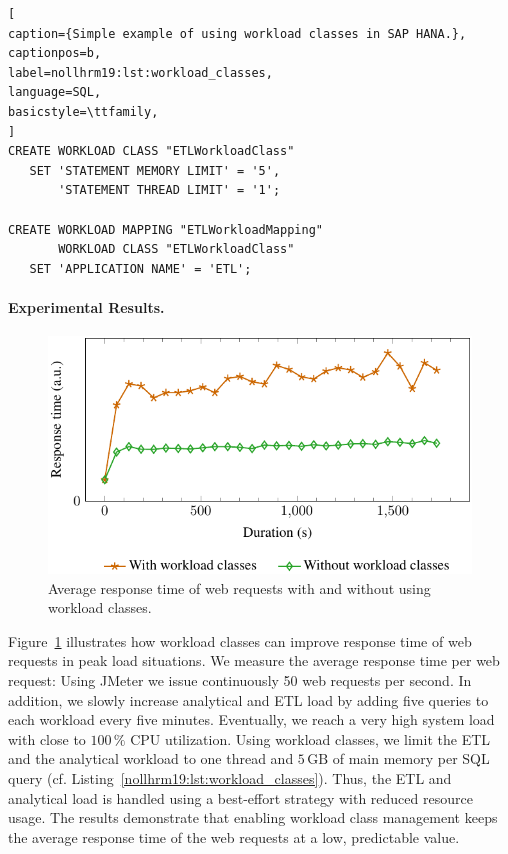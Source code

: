 \documentclass[11pt,dvipdfm]{article}
\begin{document}
\begin{lstlisting}[
caption={Simple example of using workload classes in SAP HANA.},
captionpos=b,
label=nollhrm19:lst:workload_classes,
language=SQL,
basicstyle=\ttfamily,
]
CREATE WORKLOAD CLASS "ETLWorkloadClass"
   SET 'STATEMENT MEMORY LIMIT' = '5',
       'STATEMENT THREAD LIMIT' = '1';

CREATE WORKLOAD MAPPING "ETLWorkloadMapping"
       WORKLOAD CLASS "ETLWorkloadClass"
   SET 'APPLICATION NAME' = 'ETL'; 
\end{lstlisting}

\paragraph*{Experimental Results.}
\begin{figure}
\centering
\includegraphics[bb=0 0 317 178]{figs/figure1.pdf}
\caption{Average response time of web requests with and without using workload classes.}
\label{nollhrm19:plt:wlm_jmeter}
\end{figure}
Figure~\ref{nollhrm19:plt:wlm_jmeter} illustrates how workload classes can improve response time of web requests in peak load situations.
We measure the average response time per web request: 
Using JMeter we issue continuously 50 web requests per second.
In addition, we slowly increase analytical and ETL load by adding five queries to each workload every five minutes.
Eventually, we reach a very high system load with close to $100\,\mathrm{\%}$ CPU utilization.
Using workload classes, we limit the ETL and the analytical workload to one thread and $5\,\mathrm{GB}$ of main memory per SQL query (cf. Listing~\ref{nollhrm19:lst:workload_classes}).
Thus, the ETL and analytical load is handled using a best-effort strategy with reduced resource usage.
The results demonstrate that enabling workload class management keeps the average response time of the web requests at a low, predictable value.
\end{document}
